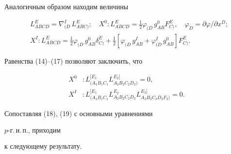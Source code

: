 Аналогичным образом находим величины


\begin{align}


& L^E_{ABCD}=\nabla^I_{(D}\,L^E_{ABC)};\quad


X^0:L^E_{ABCD}=\frac{1}{2}\varphi_{(D}\,g^0_{AB}F^E_{C)},\quad


\varphi_D=\partial\varphi/\partial x^D; \\


& X^I:L^E_{ABCD}=\frac{1}{2}\varphi_{(D}\,g^0_{AB}\delta^E_{C)}+


\frac{1}{2}[\varphi_{(D}\,g^I_{AB}+\varphi^I_{(D}\,


g^0_{AB}]F^E_{C)}.


\end{align}


Равенства (14)--(17) позволяют заключить, что


\begin{align}


X^0&: L^{[E_1}_{(A_1B_1C_1}L^{E_2]}_{A_2B_2C_2D_2)}=0, \\


X^I&: L^{[E_1}_{(A_1B_1C_1}


L^{E_2}_{A_2B_2C_2D_2}L^{E_3]}_{A_3B_3C_3D_3F_3)}=0.


\end{align}





Сопоставляя (18), (19) с основными уравнениями


$p$-г.\,и.\,п., приходим


к следующему результату.





